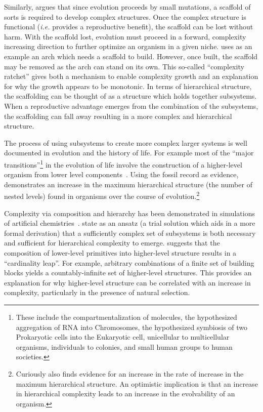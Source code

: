Similarly, \citet{cairns1995complexity} argues that since evolution
proceeds by small mutations, a scaffold of sorts is required to develop complex
structures. Once the complex structure is functional (\emph{i.e.} provides a
reproductive benefit), the scaffold can be lost without harm. With the scaffold
lost, evolution must proceed in a forward, complexity increasing direction to
further optimize an organism in a given niche. \citet{cairns1995complexity}
uses as an example an arch which needs a scaffold to build. However, once
built, the scaffold may be removed as the arch can stand on its own. This
so-called ``complexity ratchet'' gives both a mechanism to enable complexity
growth and an explanation for why the growth appears to be monotonic. In terms
of hierarchical structure, the scaffolding can be thought of as a structure
which holds together subsystems. When a reproductive advantage emerges from the
combination of the subsystems, the scaffolding can fall away resulting in a
more complex and hierarchical structure.

The process of using subsystems to create more complex larger systems is well
documented in evolution and the history of life. For example most of the
``major transitions''\footnote{These include the compartmentalization of
molecules, the hypothesized aggregation of RNA into Chromosomes, the
hypothesized symbiosis of two Prokaryotic cells into the Eukaryotic cell,
unicellular to multicellular organisms, individuals to colonies, and small
human groups to human societies.} in the evolution of life involve the
construction of a higher-level organism from lower level
components~\citep{smith1997major}. Using the fossil record as evidence,
\citet{mcshea2001hierarchical} demonstrates an increase in the maximum
hierarchical structure (the number of nested levels) found in organisms over
the course of evolution.\footnote{Curiously \citet{mcshea2001hierarchical} also
finds evidence for an increase in the rate of increase in the maximum
hierarchical structure. An optimistic implication is that an increase in
hierarchical complexity leads to an increase in the evolvability of an
organism.}

Complexity via composition and hierarchy has been demonstrated in simulations
of artificial chemistries~\citep{rasmussen2001ansatz, sayama2019cardinality}.
\citet{rasmussen2001ansatz} state as an ansatz (a trial solution which aids in
a more formal derivation) that a sufficiently complex set of subsystems is both
necessary and sufficient for hierarchical complexity to emerge.
\citet{sayama2019cardinality} suggests that the composition of lower-level
primitives into higher-level structure results in a ``cardinality leap''. For
example, arbitrary combinations of a finite set of building blocks yields a
countably-infinite set of higher-level structures. This provides an explanation
for why higher-level structure can be correlated with an increase in
complexity, particularly in the presence of natural selection.
